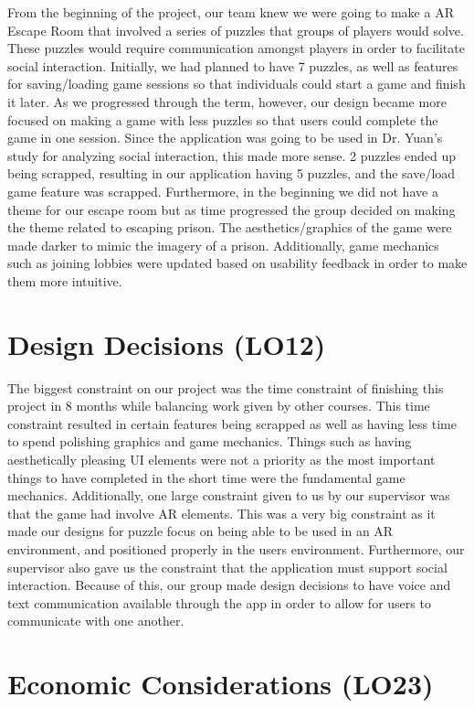 \documentclass{article}
\begin{document}
From the beginning of the project, our team knew we were going to make a AR Escape Room that involved a series of puzzles that groups of players would solve. These puzzles would require communication amongst players in order to facilitate social interaction. Initially, we had planned to have 7 puzzles, as well as features for saving/loading game sessions so that individuals could start a game and finish it later. As we progressed through the term, however, our design became more focused on making a game with less puzzles so that users could complete the game in one session. Since the application was going to be used in Dr. Yuan's study for analyzing social interaction, this made more sense. 2 puzzles ended up being scrapped, resulting in our application having 5 puzzles, and the save/load game feature was scrapped. Furthermore, in the beginning we did not have a theme for our escape room but as time progressed the group decided on making the theme related to escaping prison. The aesthetics/graphics of the game were made darker to mimic the imagery of a prison. Additionally, game mechanics such as joining lobbies were updated based on usability feedback in order to make them more intuitive.

\section{Design Decisions (LO12)}
The biggest constraint on our project was the time constraint of finishing this project in 8 months while balancing work given by other courses. This time constraint resulted in certain features being scrapped as well as having less time to spend polishing graphics and game mechanics. Things such as having aesthetically pleasing UI elements were not a priority as the most important things to have completed in the short time were the fundamental game mechanics. Additionally, one large constraint given to us by our supervisor was that the game had involve AR elements. This was a very big constraint as it made our designs for puzzle focus on being able to be used in an AR environment, and positioned properly in the users environment. Furthermore, our supervisor also gave us the constraint that the application must support social interaction. Because of this, our group made design decisions to have voice and text communication available through the app in order to allow for users to communicate with one another. 

\section{Economic Considerations (LO23)}
\end{document}
